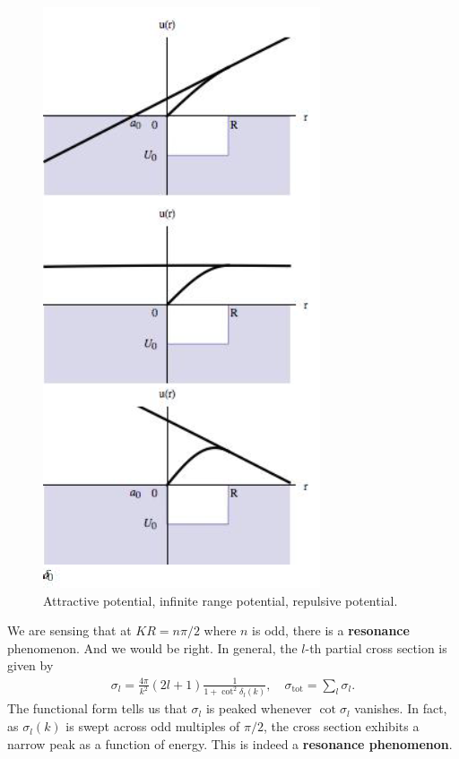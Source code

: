 \documentclass{book}
\theoremstyle{definition}
\newcommand{\f}[2]{\frac{#1}{#2}}
\begin{document}
\begin{figure}[!htb]
	\centering
	\includegraphics[scale=0.7]{figures/a0.png}
	\caption{Attractive potential, infinite range potential, repulsive potential.}
\end{figure}



We are sensing that at $KR = n\pi/2$ where $n$ is odd, there is a \textbf{resonance} phenomenon. And we would be right. In general, the $l$-th partial cross section is given by 
\begin{align*}
	\sigma_l = \f{4\pi}{k^2}(2l+1) \f{1}{1+ \cot^2\delta_l(k)}, \quad \sigma_\text{tot} = \sum_l \sigma_l.
\end{align*}
The functional form tells us that $\sigma_l$ is peaked whenever $\cot\sigma_l$ vanishes. In fact, as $\sigma_l(k)$ is swept across odd multiples of  $\pi/2$, the cross section exhibits a narrow peak as a function of energy. This is indeed a \textbf{resonance phenomenon}. 
\end{document}
